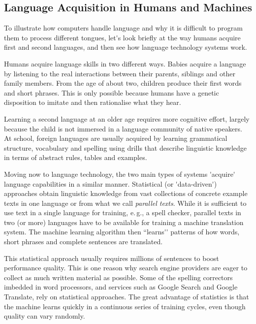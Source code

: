 \begin{multicols}{2}
\subsection{Language Acquisition in Humans and Machines}

To illustrate how computers handle language and why it is difficult to program them to process different tongues, let{\mbox '}s look briefly at the way humans acquire first and second languages, and then see how language technology systems work.

Humans acquire language skills in two different ways. Babies acquire a language by listening to the real interactions between their parents, siblings and other family members. From the age of about two, children produce their first words and short phrases. This is only possible because humans have a genetic disposition to imitate and then rationalise what they hear. 

Learning a second language at an older age requires more cognitive effort, largely because the child is not immersed in a language community of native speakers. At school, foreign languages are usually acquired by learning grammatical structure, vocabulary and spelling using drills that describe linguistic knowledge in terms of abstract rules, tables and examples.


Moving now to language technology, the two main types of systems
{\mbox '}acquire{\mbox '} language capabilities in a similar
manner. Statistical (or {\mbox '}data-driven{\mbox '}) approaches
obtain linguistic knowledge from vast collections of concrete example
texts in one language or from what we call {\em parallel texts}. While
it is sufficient to use text in a single language for training,
e.\,g., a spell checker, parallel texts in two (or more) languages
have to be available for training a machine translation system. The
machine learning algorithm then ``learns{\mbox '}{\mbox '} patterns of
how words, short phrases and complete sentences are translated.

This statistical approach usually requires millions of sentences to boost performance quality. This is one reason why search engine providers are eager to collect as much written material as possible. Some of the spelling correctors imbedded in word processors, and services such as Google Search and Google Translate, rely on statistical approaches. The great advantage of statistics is that the machine learns quickly in a continuous series of training cycles, even though quality can vary randomly.


\end{multicols}

